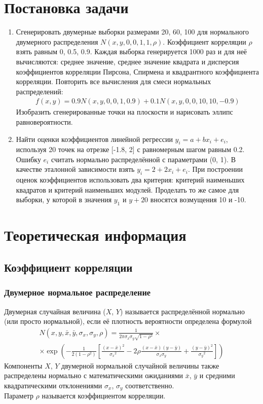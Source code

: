 \section{Постановка задачи}
    \begin{enumerate}
        \item 
    Сгенерировать двумерные выборки размерами 20, 60, 100 для нормального
    двумерного распределения $N(x,y,0,0,1,1,\rho)$.
    Коэффициент корреляции $\rho$ взять равным 0, 0.5, 0.9.
    Каждая выборка генерируется 1000 раз и для неё вычисляются: среднее
    значение, среднее значение квадрата и дисперсия коэффициентов корреляции Пирсона, Спирмена и квадрантного коэффициента корреляции.
    Повторить все вычисления для смеси нормальных распределений: 
        \begin{gather*}
             f(x,y) = 0.9N(x,y,0,0,1,0.9) + 0.1N(x,y,0,0,10,10,-0.9)
        \end{gather*}
    Изобразить сгенерированные точки на плоскости и нарисовать эллипс равновероятности.
        \item 
    Найти оценки коэффициентов линейной регрессии $y_i = a + bx_i + e_i$,  используя 20 точек на отрезке [-1.8, 2] с равномерным шагом равным 0.2. Ошибку $e_i$ считать нормально распределённой с параметрами (0, 1). В качестве эталонной зависимости взять $y_i = 2 + 2x_i + e_i$. При построении оценок коэффициентов использовать два критерия: критерий наименьших квадратов и критерий наименьших модулей. Проделать то же самое для выборки, у которой в значения $y_1$ и $y+{20}$ вносятся возмущения 10 и -10.
        \end{enumerate}


\section{Теоретическая информация}
    \subsection{Коэффициент корреляции}
        \subsubsection{Двумерное нормальное распределение}
        Двумерная случайная величина ($X$, $Y$) называется распределённой нормально (или просто нормальной), если её плотность вероятности определена формулой
            \begin{gather}
                N(x,y,\bar{x},\bar{y},\sigma_x, \sigma_y, \rho) = \frac{1}{2\pi\sigma_x\sigma_y\sqrt{1-{\rho}^2}}\times \\
                \times\exp(-\frac{1}{2(1-{\rho}^2)}\left[\frac{(x-\bar{x})^2}{{\sigma_x}^2} - 2\rho\frac{(x-\bar{x})(y-\bar{y})}{\sigma_x\sigma_y} + \frac{(y-\bar{y})^2}{{\sigma_y}^2}\right])
            \end{gather}
            Компоненты $X$, $Y$ двумерной нормальной случайной величины также распределены нормально с математическими ожиданиями $\bar{x}$, $\bar{y}$ и средними квадратическими отклонениями $\sigma_x$, $\sigma_y$ соответственно. \\
            Параметр $\rho$ называется коэффициентом корреляции.
